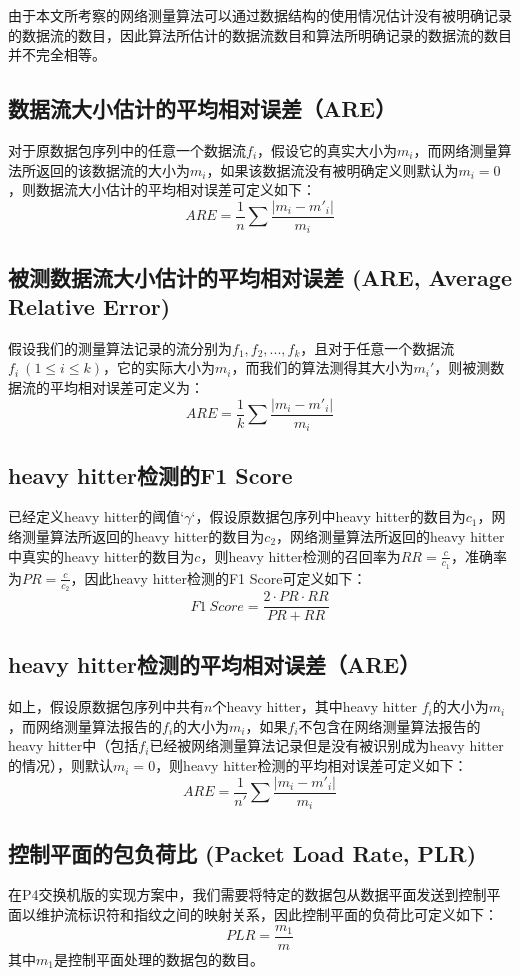 \documentclass{article}
\begin{document}
由于本文所考察的网络测量算法可以通过数据结构的使用情况估计没有被明确记录的数据流的数目，因此算法所估计的数据流数目和算法所明确记录的数据流的数目并不完全相等。

\subsection{ 数据流大小估计的平均相对误差（ARE）}
对于原数据包序列中的任意一个数据流$f_i$，假设它的真实大小为$m_i$，而网络测量算法所返回的该数据流的大小为$m_i$，如果该数据流没有被明确定义则默认为$m_i=0$，则数据流大小估计的平均相对误差可定义如下：
$$
ARE=\frac{1}{n}\sum\frac{|m_i - m'_i|}{m_i}
$$

\subsection{被测数据流大小估计的平均相对误差 (ARE, Average Relative Error)}
假设我们的测量算法记录的流分别为$f_1, f_2, ..., f_k$，且对于任意一个数据流$f_i ~(1 \le i \le k)$，它的实际大小为$m_i$，而我们的算法测得其大小为$m_i'$，则被测数据流的平均相对误差可定义为：
$$
ARE = \frac{1}{k}\sum\frac{|m_i - m'_i|}{m_i}
$$

\subsection{ heavy hitter检测的F1 Score}
已经定义heavy hitter的阈值`$\gamma$`，假设原数据包序列中heavy hitter的数目为$c_1$，网络测量算法所返回的heavy hitter的数目为$c_2$，网络测量算法所返回的heavy hitter中真实的heavy hitter的数目为$c$，则heavy hitter检测的召回率为$RR=\frac{c}{c_1}$，准确率为$PR=\frac{c}{c_2}$，因此heavy hitter检测的F1 Score可定义如下：
$$
F1~Score=\frac{2\cdot PR \cdot RR}{PR + RR}
$$

\subsection{ heavy hitter检测的平均相对误差（ARE）}
如上，假设原数据包序列中共有$n$个heavy hitter，其中heavy hitter $f_i$的大小为$m_i$，而网络测量算法报告的$f_i$的大小为$m_i$，如果$f_i$不包含在网络测量算法报告的heavy hitter中（包括$f_i$已经被网络测量算法记录但是没有被识别成为heavy hitter的情况），则默认$m_i=0$，则heavy hitter检测的平均相对误差可定义如下：
$$
ARE = \frac{1}{n'}\sum\frac{|m_i - m'_i|}{m_i}
$$

\subsection{ 控制平面的包负荷比 (Packet Load Rate, PLR)}
在P4交换机版的实现方案中，我们需要将特定的数据包从数据平面发送到控制平面以维护流标识符和指纹之间的映射关系，因此控制平面的负荷比可定义如下：
$$
PLR = \frac{m_1}{m}
$$
其中$m_1$是控制平面处理的数据包的数目。
\end{document}
